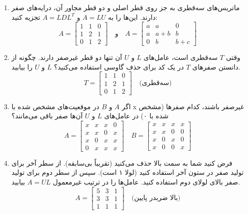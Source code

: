 \documentclass[12pt, a4paper]{book}
\begin{document}
\begin{enumerate}
		\item ماتریس‌های سه‌قطری به جز روی قطر اصلی و دو قطر مجاور آن، درایه‌های صفر دارند. این‌ها را به $A=LU$ و $A=LDL^T$ تجزیه کنید:
		\[ A = \begin{bmatrix} 1 & 1 & 0 \\ 1 & 2 & 1 \\ 0 & 1 & 2 \end{bmatrix} \quad \text{و} \quad A = \begin{bmatrix} a & a & 0 \\ a & a+b & b \\ 0 & b & b+c \end{bmatrix} \]
		
		\item وقتی $T$ سه‌قطری است، عامل‌های $L$ و $U$ آن تنها دو قطر غیرصفر دارند. چگونه از دانستن صفرهای $T$ در یک کد برای حذف گاوسی استفاده می‌کنید؟ $L$ و $U$ را بیابید.
		\[ T = \begin{bmatrix} 1 & 1 & 0 \\ 1 & 2 & 1 \\ 0 & 1 & 2 \end{bmatrix} \quad \text{(سه‌قطری)} \]
		
		\item اگر $A$ و $B$ در موقعیت‌های مشخص شده با x غیرصفر باشند، کدام صفرها (مشخص شده با ۰) در عامل‌های $L$ و $U$ آن‌ها صفر باقی می‌مانند؟
		\[ A = \begin{bmatrix} x & x & x & 0 \\ x & x & 0 & x \\ x & 0 & x & x \\ 0 & x & x & x \end{bmatrix} \quad B = \begin{bmatrix} x & x & x & x \\ x & x & 0 & 0 \\ x & 0 & x & 0 \\ x & 0 & 0 & x \end{bmatrix} \]
		
		\item فرض کنید شما به سمت بالا حذف می‌کنید (تقریباً بی‌سابقه). از سطر آخر برای تولید صفر در ستون آخر استفاده کنید (لولا ۱ است). سپس از سطر دوم برای تولید صفر بالای لولای دوم استفاده کنید. عامل‌ها را در ترتیب غیرمعمول $A=UL$ بیابید.
		\[ A = \begin{bmatrix} 5 & 3 & 1 \\ 3 & 3 & 1 \\ 1 & 1 & 1 \end{bmatrix} \quad \text{(بالا ضربدر پایین)} \]
		

\end{enumerate}
\end{document}
